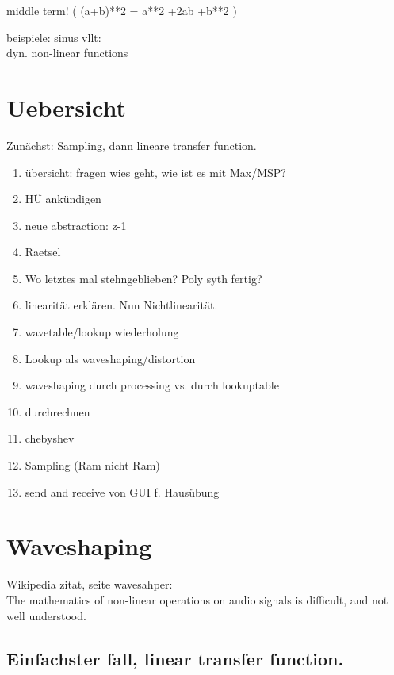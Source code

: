 middle term! ( (a+b)**2 = a**2 +2ab +b**2 ) 




beispiele:
sinus
vllt:\\
dyn. non-linear functions




\section{Uebersicht}
Zunächst: Sampling, dann lineare transfer function.

\begin{enumerate}
	\item übersicht: fragen wies geht, wie ist es mit Max/MSP?
	\item HÜ ankündigen
	\item neue abstraction: z-1 
	\item Raetsel
	\item Wo letztes mal stehngeblieben? Poly syth fertig?
	\item linearität erklären. Nun Nichtlinearität.
	\item wavetable/lookup wiederholung
	\item Lookup als waveshaping/distortion
	\item waveshaping durch processing vs. durch lookuptable
	\item durchrechnen
	\item chebyshev
	\item Sampling (Ram nicht Ram)
	\item send and receive von GUI f. Hausübung
\end{enumerate}

\section{Waveshaping}
Wikipedia zitat, seite wavesahper:\\
\glqq{}The mathematics of non-linear operations on audio signals is difficult, and not well understood.\grqq{}



\subsection{Einfachster fall, linear transfer function.} %
\label{sub:linearTrans}




